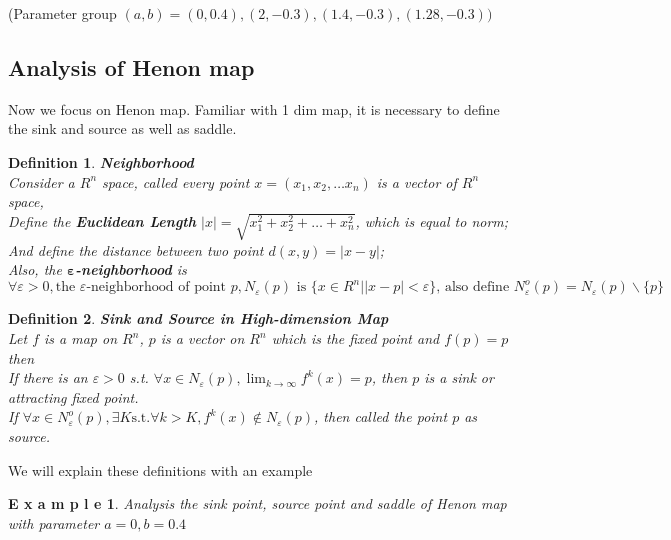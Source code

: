 \documentclass[12pt]{article}
\theoremstyle{plain}
\newtheorem{definition}{\textbf{Definition}}[section]
\newtheorem{example}{\textbf{E x a m p l e}}[section]
\begin{document}
(Parameter group $(a, b) = (0, 0.4), (2, -0.3), (1.4, -0.3), (1.28, -0.3))$







\subsection{Analysis of Henon map}
Now we focus on Henon map. Familiar with 1 dim map, it is necessary to define the sink and source as well as saddle.

\begin{definition}\textbf{Neighborhood}
\\\noindent Consider a $R^n$ space, called every point $x = (x_1, x_2, \ldots x_n)$ is a vector of $R^n$ space,
\\\noindent Define the \textbf{Euclidean Length} $|x| = \sqrt{x_1^2 + x_2^2 + \ldots + x_n^2}$, which is equal to norm;
\\\noindent And define the distance between two point $d(x, y) = |x - y|$;
\\\noindent Also, the \textbf{$\mathbf{\varepsilon}$-neighborhood} is 
$$
\forall \varepsilon > 0, \text{the }\varepsilon \text{-neighborhood of point }p, N_\varepsilon(p) \text{ is } \{x\in R^n | |x - p| < \varepsilon\} \text{, also define }N_\varepsilon^o(p) = N_\varepsilon(p)\backslash\{p\}
$$
\end{definition}

\begin{definition}\textbf{Sink and Source in High-dimension Map}
\\\noindent Let $f$ is a map on $R^n$, $p$ is a vector on $R^n$ which is the fixed point and $f(p) = p$ then 
\\\noindent If there is an $\varepsilon > 0$ s.t. $\forall x \in N_\varepsilon(p), \lim_{k \rightarrow \infty}f^k(x) = p$, then $p$ is a sink or attracting fixed point.
\\\noindent If $\forall x \in N_\varepsilon^o(p), \exists K \text{s.t.} \forall k > K, f^k(x) \notin N_\varepsilon(p)$, then called the point $p$ as source.
\end{definition}


We will explain these definitions with an example


\begin{example} \label{Henon-map-0-0*4}Analysis the sink point, source point and saddle of Henon map with parameter $a = 0, b = 0.4$
\end{example}
\end{document}
